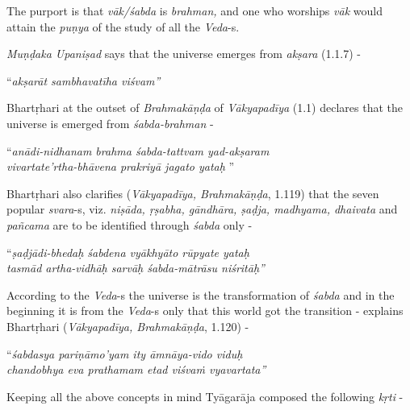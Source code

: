 The purport is that \textit{vāk/śabda} is \textit{brahman,} and one who worships \textit{vāk} would attain the \textit{puṇya} of the study of all the \textit{Veda}-s.

\textit{Muṇḍaka Upaniṣad} says that the universe emerges from \textit{akṣara} (1.1.7) -

\begin{centerquote}
“\textit{akṣarāt sambhavatīha viśvam”}
\end{centerquote}

Bhartṛhari at the outset of \textit{Brahmakāṇḍa} of \textit{Vākyapadīya} (1.1) declares that the universe is emerged from \textit{śabda-brahman} -

\begin{centerquote}
“\textit{anādi-nidhanam brahma śabda-tattvam yad-akṣaram }\\ \textit{vivartate’rtha-bhāvena prakriyā jagato yataḥ} ”
\end{centerquote}

Bhartṛhari also clarifies (\textit{Vākyapadīya, Brahmakāṇḍa}, 1.119) that the seven popular \textit{svara}-s, viz. \textit{niṣāda, ṛṣabha, gāndhāra, ṣaḍja, madhyama, dhaivata} and \textit{pañcama} are to be identified through \textit{śabda} only -

\begin{centerquote}
“\textit{ṣaḍjādi-bhedaḥ śabdena vyākhyāto rūpyate yataḥ }\\ \textit{tasmād artha-vidhāḥ sarvāḥ śabda-mātrāsu niśritāḥ”} 
\end{centerquote}

According to the \textit{Veda}-s the universe is the transformation of \textit{śabda} and in the beginning it is from the \textit{Veda}-s only that this world got the transition - explains Bhartṛhari (\textit{Vākyapadīya, Brahmakāṇḍa}, 1.120) -

\begin{centerquote}
“\textit{śabdasya pariṇāmo’yam ity āmnāya-vido viduḥ }\\ \textit{chandobhya eva prathamam etad viśvaṁ vyavartata”} 
\end{centerquote}

Keeping all the above concepts in mind Tyāgarāja composed the following \textit{kṛti} -

